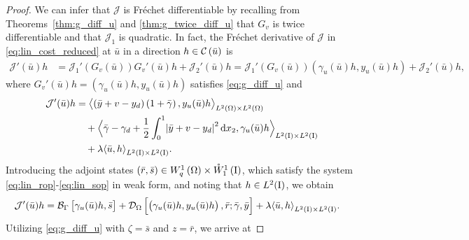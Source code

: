 \documentclass[final]{siamltex}
\begin{document}
\begin{proof}
We can infer that $\mathcal J$ is Fr\'echet differentiable by recalling from 
Theorems~\ref{thm:g_diff_u} and \ref{thm:g_twice_diff_u} that $G_v$ is twice differentiable and 
that ${\mathcal{J}}_1$ is quadratic. In fact, the Fr\'echet derivative of ${\mathcal{J}}$ in 
\eqref{eq:lin_cost_reduced} at ${\bar{u}}$ in a direction $h \in {{\mathcal C\del{{\bar{u}}}}}$ is
\begin{align*}
	{\mathcal{J}}'({\bar{u}}) h &= {\mathcal{J}}_1'(G_v({\bar{u}}))G_v'({\bar{u}}) h + {\mathcal{J}}_2'({\bar{u}}) h  
                     = {\mathcal{J}}_1'(G_v({\bar{u}})) (\gamma_u({\bar{u}})h, y_u({\bar{u}})h) 
                     + {\mathcal{J}}_2'({\bar{u}}) h ,
\end{align*}
where $G_v'({\bar{u}}) h = (\gamma_u({\bar{u}})h, y_u({\bar{u}})h)$ 
satisfies \eqref{eq:g_diff_u} and 
	\begin{equation}\begin{aligned} \label{eq:red_cost_first_deriv}
		{\mathcal{J}}'({\bar{u}}) h
			&=  {{\mathop{{\left\langle {{   \del{{\bar{y}}+v-y_d}\del{1+{\bar{\gamma}}}, y_u({\bar{u}})h}} \right\rangle}}}_{{{L^2\del{{{\Omega}}}}}\times{{L^2\del{{{\Omega}}}}}}} \\ 
            &\quad +  \Big\langle{{\bar{\gamma}}-\gamma_d+
              \frac{1}{2}\int_0^1\abs{{\bar{y}}+v-y_d}^2 \dif x_2,\gamma_u({\bar{u}})h}\Big\rangle_{L^2({\text{\rm I}})\times L^2({\text{\rm I}})} \\
	        &\quad + \lambda {{\mathop{{\left\langle {{{\bar{u}}, h}} \right\rangle}}}_{{{L^2\del{{{\text{\rm I}}}}}}\times{{L^2\del{{{\text{\rm I}}}}}}}} . 
	\end{aligned}\end{equation}
Introducing the adjoint states $({\bar{r}},{\bar{s}}) \in {{W^{{1}}_{{q}}\del{{\Omega}}}} \times {{\mathring{W}^{{1}}_{{1}}\del{{\text{\rm I}}}}}$, which satisfy the system 
\eqref{eq:lin_rop}-\eqref{eq:lin_sop} in weak form, and noting that $h \in L^2({\text{\rm I}})$, we obtain
\begin{align*}
	\mathcal{J}'({\bar{u}}) h 
		&= {{\mathcal{B}}_\Gamma}\sbr{\gamma_u({\bar{u}})h,{\bar{s}}} + {{\mathcal{D}}_\Omega}\sbr{\del{\gamma_u({\bar{u}})h, y_u({\bar{u}})h},{\bar{r}}; {\bar{\gamma}}, {\bar{y}}} + \lambda {{\mathop{{\left\langle {{{\bar{u}}, h}} \right\rangle}}}_{{{L^2\del{{{\text{\rm I}}}}}}\times{{L^2\del{{{\text{\rm I}}}}}}}}. 
\end{align*}
Utilizing \eqref{eq:g_diff_u} with $\zeta = {\bar{s}}$ and $z = {\bar{r}}$, we arrive at

\end{proof}
\end{document}
